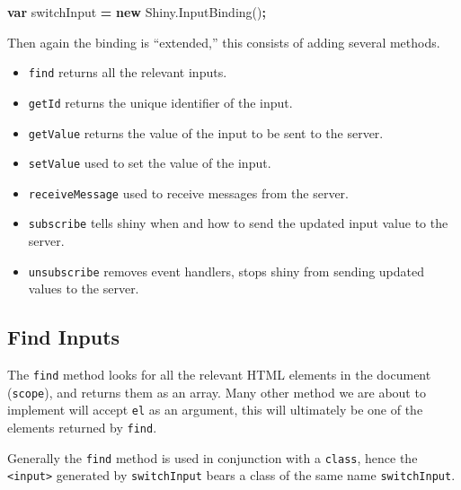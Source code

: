 \documentclass[
]{krantz}
\makeatletter
\newenvironment{Shaded}{\begin{snugshade}}{\end{snugshade}}
\newcommand{\AttributeTok}[1]{\textcolor[rgb]{0.61,0.61,0.61}{#1}}
\newcommand{\CommentTok}[1]{\textcolor[rgb]{0.37,0.37,0.37}{\textit{#1}}}
\newcommand{\ControlFlowTok}[1]{\textcolor[rgb]{0.27,0.27,0.27}{\textbf{#1}}}
\newcommand{\DataTypeTok}[1]{\textcolor[rgb]{0.27,0.27,0.27}{#1}}
\newcommand{\KeywordTok}[1]{\textcolor[rgb]{0.27,0.27,0.27}{\textbf{#1}}}
\newcommand{\NormalTok}[1]{#1}
\newcommand{\OperatorTok}[1]{\textcolor[rgb]{0.43,0.43,0.43}{\textbf{#1}}}
\newcommand{\StringTok}[1]{\textcolor[rgb]{0.5,0.5,0.5}{#1}}
\newcommand{\VariableTok}[1]{\textcolor[rgb]{0,0,0}{#1}}
\providecommand{\tightlist}{%
  \setlength{\itemsep}{0pt}\setlength{\parskip}{0pt}}
\newenvironment{kframe}{%
\medskip{}
\setlength{\fboxsep}{.8em}
 \def\at@end@of@kframe{}%
 \ifinner\ifhmode%
  \def\at@end@of@kframe{\end{minipage}}%
  \begin{minipage}{\columnwidth}%
 \fi\fi%
 \def\FrameCommand##1{\hskip\@totalleftmargin \hskip-\fboxsep
 \colorbox{shadecolor}{##1}\hskip-\fboxsep
     \hskip-\linewidth \hskip-\@totalleftmargin \hskip\columnwidth}%
 \MakeFramed {\advance\hsize-\width
   \@totalleftmargin\z@ \linewidth\hsize
   \@setminipage}}%
 {\par\unskip\endMakeFramed%
 \at@end@of@kframe}
\renewenvironment{Shaded}{\begin{kframe}}{\end{kframe}}
\makeatother
\begin{document}
\begin{Shaded}
\begin{Highlighting}[]
\KeywordTok{var}\NormalTok{ switchInput }\OperatorTok{=} \KeywordTok{new} \VariableTok{Shiny}\NormalTok{.}\AttributeTok{InputBinding}\NormalTok{()}\OperatorTok{;}
\end{Highlighting}
\end{Shaded}

Then again the binding is ``extended,'' this consists of adding several methods.

\begin{itemize}
\tightlist
\item
  \texttt{find} returns all the relevant inputs.
\item
  \texttt{getId} returns the unique identifier of the input.
\item
  \texttt{getValue} returns the value of the input to be sent to the server.
\item
  \texttt{setValue} used to set the value of the input.
\item
  \texttt{receiveMessage} used to receive messages from the server.
\item
  \texttt{subscribe} tells shiny when and how to send the updated input value to the server.
\item
  \texttt{unsubscribe} removes event handlers, stops shiny from sending updated values to the server.
\end{itemize}

\hypertarget{shiny-input-find}{%
\subsection{Find Inputs}\label{shiny-input-find}}

The \texttt{find} method looks for all the relevant HTML elements in the document (\texttt{scope}), and returns them as an array. Many other method we are about to implement will accept \texttt{el} as an argument, this will ultimately be one of the elements returned by \texttt{find}.

Generally the \texttt{find} method is used in conjunction with a \texttt{class}, hence the \texttt{\textless{}input\textgreater{}} generated by \texttt{switchInput} bears a class of the same name \texttt{switchInput}.

\begin{Shaded}
\end{Shaded}
\end{document}
